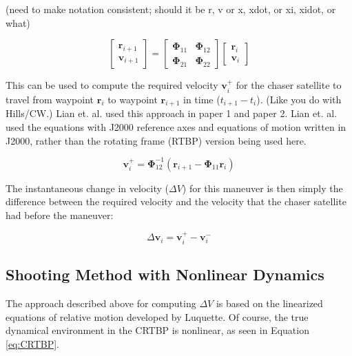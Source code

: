 \documentclass[a4paper]{article}
\begin{document}
(need to make notation consistent; should it be r, v or x, xdot, or xi, xidot, or what)

\begin{equation}
\begin{bmatrix}
		\mathbf{r}_{i+1} \\
		\mathbf{v}_{i+1}
		\end{bmatrix}
= 
\begin{bmatrix}
		\boldsymbol{\Phi}_{11} & \boldsymbol{\Phi}_{12} \\
		\boldsymbol{\Phi}_{21} & \boldsymbol{\Phi}_{22}
		\end{bmatrix}
\begin{bmatrix}
		\mathbf{r}_i \\
		\mathbf{v}_i
		\end{bmatrix}
\end{equation}

This can be used to compute the required velocity \(\mathbf{v}_i^+\) for the chaser satellite to travel from waypoint \(\mathbf{r}_i\) to waypoint \(\mathbf{r}_{i+1}\) in time (\(t_{i+1} - t_i\)).  (Like you do with Hills/CW.)  Lian et. al. used this approach in paper 1 and paper 2.  Lian et. al. used the equations with J2000 reference axes and equations of motion written in J2000, rather than the rotating frame (RTBP) version being used here.

\begin{equation} \label{eq:RequiredVelocity}
\mathbf{v}_i^+ = \boldsymbol{\Phi}_{12}^{-1}(\mathbf{r}_{i+1} - \boldsymbol{\Phi}_{11}\mathbf{r}_i)
\end{equation}

The instantaneous change in velocity (\(\Delta V\)) for this maneuver is then simply the difference between the required velocity and the velocity that the chaser satellite had before the maneuver:

\begin{equation} \label{eq:DeltaV}
\Delta \mathbf{v}_i = \mathbf{v}_i^+ - \mathbf{v}_i^-
\end{equation}

\subsection{Shooting Method with Nonlinear Dynamics}

The approach described above for computing \(\Delta V\) is based on the linearized equations of relative motion developed by Luquette.  Of course, the true dynamical environment in the CRTBP is nonlinear, as seen in Equation \ref{eq:CRTBP}.
\end{document}
